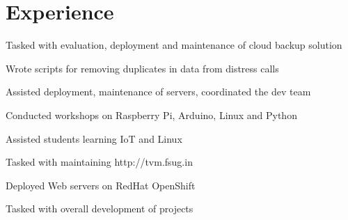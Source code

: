 \documentclass[]{resume_karuvally_openfont}
\begin{document}
\begin{minipage}[t]{0.66\textwidth} 


\section{Experience}

\vspace{\topsep} %
\begin{tightemize}
\item Tasked with evaluation, deployment and maintenance of cloud backup
    solution
\end{tightemize}
\sectionsep

\begin{tightemize}
\item Wrote scripts for removing duplicates in data from distress calls
\item Assisted deployment, maintenance of servers, coordinated the dev team
\end{tightemize}
\sectionsep

\begin{tightemize}
\item Conducted workshops on Raspberry Pi, Arduino, Linux and Python
\item Assisted students learning IoT and Linux
\end{tightemize}
\sectionsep

\begin{tightemize}
\item Tasked with maintaining http://tvm.fsug.in 
\end{tightemize}
\sectionsep

\begin{tightemize}
\item Deployed Web servers on RedHat OpenShift
\item Tasked with overall development of projects 
\end{tightemize}
\sectionsep


\end{minipage}
\end{document}
